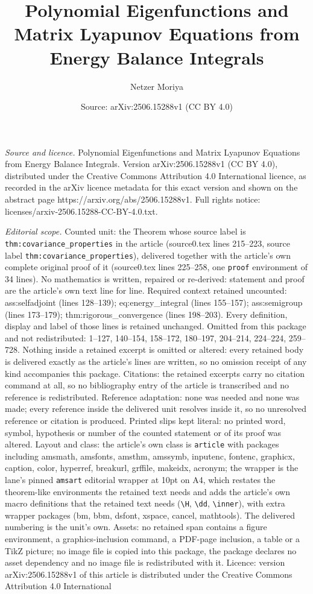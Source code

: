 \documentclass[10pt,a4paper]{amsart}
\title[Polynomial Eigenfunctions and Matrix Lyapunov Equations from]{Polynomial Eigenfunctions and Matrix Lyapunov Equations from Energy Balance Integrals}
\author{Netzer Moriya}
\date{Source: arXiv:2506.15288v1 (CC BY 4.0)}
\begin{document}
\maketitle

\noindent\emph{Source and licence.} Polynomial Eigenfunctions and Matrix Lyapunov Equations from Energy Balance Integrals. Version arXiv:2506.15288v1 (CC BY 4.0), distributed under the Creative Commons Attribution 4.0 International licence, as recorded in the arXiv licence metadata for this exact version and shown on the abstract page https://arxiv.org/abs/2506.15288v1. Full rights notice: licenses/arxiv-2506.15288-CC-BY-4.0.txt.\par\smallskip

\noindent\textit{Editorial scope.} Counted unit: the Theorem whose source label is \texttt{thm:covariance\_properties} in the article (source0.tex lines 215--223, source label \texttt{thm:covariance\_properties}), delivered together with the article's own complete original proof of it (source0.tex lines 225--258, one \texttt{proof} environment of 34 lines). No mathematics is written, repaired or re-derived: statement and proof are the article's own text line for line. Required context retained uncounted: ass:selfadjoint (lines 128--139); eq:energy\_integral (lines 155--157); ass:semigroup (lines 173--179); thm:rigorous\_convergence (lines 198--203). Every definition, display and label of those lines is retained unchanged. Omitted from this package and not redistributed: 1--127, 140--154, 158--172, 180--197, 204--214, 224--224, 259--728. Nothing inside a retained excerpt is omitted or altered: every retained body is delivered exactly as the article's lines are written, so no omission receipt of any kind accompanies this package. Citations: the retained excerpts carry no citation command at all, so no bibliography entry of the article is transcribed and no reference is redistributed. Reference adaptation: none was needed and none was made; every reference inside the delivered unit resolves inside it, so no unresolved reference or citation is produced. Printed slips kept literal: no printed word, symbol, hypothesis or number of the counted statement or of its proof was altered. Layout and class: the article's own class is \texttt{article} with packages including amsmath, amsfonts, amsthm, amssymb, inputenc, fontenc, graphicx, caption, color, hyperref, breakurl, grffile, makeidx, acronym; the wrapper is the lane's pinned \texttt{amsart} editorial wrapper at 10pt on A4, which restates the theorem-like environments the retained text needs and adds the article's own macro definitions that the retained text needs (\texttt{\textbackslash H}, \texttt{\textbackslash dd}, \texttt{\textbackslash inner}), with extra wrapper packages (bm, bbm, dsfont, xspace, cancel, mathtools). The delivered numbering is the unit's own. Assets: no retained span contains a figure environment, a graphics-inclusion command, a PDF-page inclusion, a table or a TikZ picture; no image file is copied into this package, the package declares no asset dependency and no image file is redistributed with it. Licence: version arXiv:2506.15288v1 of this article is distributed under the Creative Commons Attribution 4.0 International 
\end{document}
